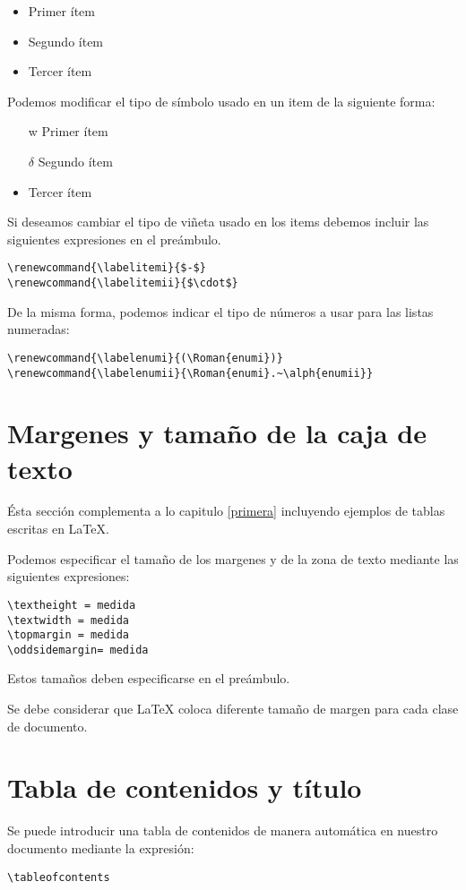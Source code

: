 \documentclass[letterpaper,12pt]{book}
\renewcommand{\labelitemi}{$-$}
\begin{document}
\begin{itemize}
	\item Primer ítem	
	\item Segundo ítem
	\item Tercer ítem
\end{itemize}


Podemos modificar el tipo de símbolo usado en un item de la siguiente forma:

\begin{itemize}
	\item[w] Primer ítem
	\item[$\delta$] Segundo ítem %
	\item Tercer ítem
\end{itemize}

Si deseamos cambiar el tipo de viñeta usado en los items debemos incluir las siguientes expresiones en el preámbulo.

\begin{verbatim}
\renewcommand{\labelitemi}{$-$}
\renewcommand{\labelitemii}{$\cdot$}
\end{verbatim}

De la misma forma, podemos indicar el tipo de números a usar para las listas numeradas:

\begin{verbatim}
\renewcommand{\labelenumi}{(\Roman{enumi})}
\renewcommand{\labelenumii}{\Roman{enumi}.~\alph{enumii}}
\end{verbatim}

\chapter{Margenes y tamaño de la caja de texto}

Ésta sección complementa a lo capitulo \ref{primera} incluyendo ejemplos de tablas escritas en \LaTeX.

Podemos especificar el tamaño de los margenes y de la zona de texto mediante las siguientes expresiones:

\begin{verbatim}
\textheight = medida
\textwidth = medida
\topmargin = medida
\oddsidemargin= medida
\end{verbatim}

Estos tamaños deben especificarse en el preámbulo.

Se debe considerar que \LaTeX{} coloca diferente tamaño de margen para cada clase de documento.

\backmatter %
\chapter{Tabla de contenidos y título}

Se puede introducir una tabla de contenidos de manera automática en nuestro documento mediante la expresión:

\begin{verbatim}
\tableofcontents
\end{verbatim}
\end{document}
